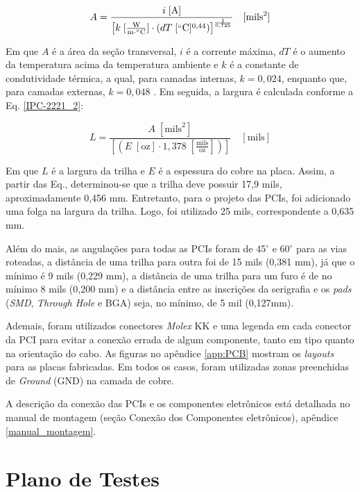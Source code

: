 \begin{equation}\label{IPC-2221}
    A = \frac{i \; [\text{A}]}{\left[ k \; [\frac{\text{W}}{\text{m} \cdot ^\circ \text{C}}] \cdot(dT \; [^\circ \text{C}]\textsuperscript{0,44})\right]^{\frac{1}{0,725}} } \quad [\text{mils}^2]
\end{equation}

Em que $A$ é a área da seção transversal, $i$ é a corrente máxima, $dT$ é o aumento da temperatura acima da temperatura ambiente e $k$ é a constante de condutividade térmica, a qual, para camadas internas, $k=0,024$, enquanto que, para camadas externas, $k=0,048$ \cite{IPC}. Em seguida, a largura é calculada conforme a Eq. \ref{IPC-2221_2}:

\begin{equation}\label{IPC-2221_2}
    L = \frac{A \; [\text{mils}^2]}{\left[(E \; [\text{oz}] \cdot 1,378 \; [\frac{\text{mils}}{\text{oz}}])\right]} \quad [\text{mils}]
\end{equation}

Em que $L$ é a largura da trilha e $E$ é a espessura do cobre na placa. Assim, a partir das Eq., determinou-se que a trilha deve possuir 17,9 mils, aproximadamente 0,456 mm. Entretanto, para o projeto das PCIs, foi adicionado uma folga na largura da trilha. Logo, foi utilizado 25 mils, correspondente a 0,635 mm.

Além do mais, as angulações para todas as PCIs foram de 45$^\circ$ e 60$^\circ$ para as vias roteadas, a distância de uma trilha para outra foi de 15 mils (0,381 mm), já que o mínimo é 9 mils (0,229 mm), a distância de uma trilha para um furo é de no mínimo 8 mils (0,200 mm) e a distância entre as inscrições da serigrafia e os \textit{pads} (\textit{SMD}, \textit{Through Hole} e BGA) seja, no mínimo, de 5 mil (0,127mm).

Ademais, foram utilizados conectores \textit{Molex} KK e uma legenda em cada conector da PCI para evitar a conexão errada de algum componente, tanto em tipo quanto na orientação do cabo. As figuras no apêndice \ref{app:PCB} mostram os \textit{layouts} para as placas fabricadas. Em todos os casos, foram utilizadas zonas preenchidas de \textit{Ground} (GND) na camada de cobre.

A descrição da conexão das PCIs e os componentes eletrônicos está detalhada no manual de montagem (seção Conexão dos Componentes eletrônicos), apêndice \ref{manual_montagem}.

\section{Plano de Testes}

